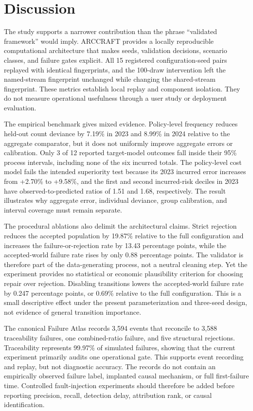 \FloatBarrier
\section{Discussion}\label{sec:discussion}

The study supports a narrower contribution than the phrase “validated framework” would imply. ARCCRAFT provides a locally reproducible computational architecture that makes seeds, validation decisions, scenario classes, and failure gates explicit. All 15 registered configuration-seed pairs replayed with identical fingerprints, and the 100-draw intervention left the named-stream fingerprint unchanged while changing the shared-stream fingerprint. These metrics establish local replay and component isolation. They do not measure operational usefulness through a user study or deployment evaluation.

The empirical benchmark gives mixed evidence. Policy-level frequency reduces held-out count deviance by 7.19\% in 2023 and 8.99\% in 2024 relative to the aggregate comparator, but it does not uniformly improve aggregate errors or calibration. Only 3 of 12 reported target-model outcomes fall inside their 95\% process intervals, including none of the six incurred totals. The policy-level cost model fails the intended superiority test because its 2023 incurred error increases from +2.70\% to +9.58\%, and the first and second incurred-risk deciles in 2023 have observed-to-predicted ratios of 1.51 and 1.68, respectively. The result illustrates why aggregate error, individual deviance, group calibration, and interval coverage must remain separate.

The procedural ablations also delimit the architectural claims. Strict rejection reduces the accepted population by 19.87\% relative to the full configuration and increases the failure-or-rejection rate by 13.43 percentage points, while the accepted-world failure rate rises by only 0.88 percentage points. The validator is therefore part of the data-generating process, not a neutral cleaning step. Yet the experiment provides no statistical or economic plausibility criterion for choosing repair over rejection. Disabling transitions lowers the accepted-world failure rate by 0.247 percentage points, or 0.69\% relative to the full configuration. This is a small descriptive effect under the present parameterization and three-seed design, not evidence of general transition importance.

The canonical Failure Atlas records 3,594 events that reconcile to 3,588 traceability failures, one combined-ratio failure, and five structural rejections. Traceability represents 99.97\% of simulated failures, showing that the current experiment primarily audits one operational gate. This supports event recording and replay, but not diagnostic accuracy. The records do not contain an empirically observed failure label, implanted causal mechanism, or full first-failure time. Controlled fault-injection experiments should therefore be added before reporting precision, recall, detection delay, attribution rank, or causal identification.

